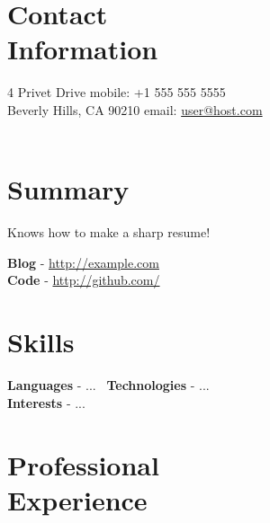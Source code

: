 \documentclass[margin,line,11pt]{resume}
\begin{document}
\pagestyle{headings}
\begin{resume}
    \section{\mysidestyle Contact\\Information}

    4 Privet Drive			\hfill mobile: +1 555 555 5555				\vspace{0mm}\\\vspace{0mm}%
    Beverly Hills, CA 90210		\hfill email: \href{mailto:user@host.com}{user@host.com}		\vspace{0mm}\\\vspace{0mm}%
 \vspace{0mm}\\\vspace{-6.5mm}%

    \section{\mysidestyle Summary}

    Knows how to make a sharp resume!

	\textbf{Blog} - \href{http://example.com}{http://example.com} \\
	\textbf{Code} - \href{http://github.com/}{http://github.com/}
    \section{\mysidestyle Skills}
	\textbf{Languages} - ... \
	\textbf{Technologies} - ... \\
	\textbf{Interests} - ... \\
    \section{\mysidestyle Professional\\Experience}


\end{resume}
\end{document}
